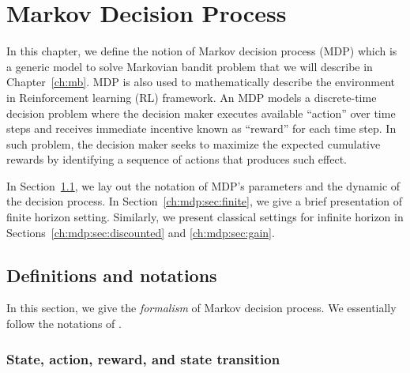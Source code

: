 \begingroup

\let\clearpage\relax

\chapter{Markov Decision Process}
\label{ch:mdp}


In this chapter, we define the notion of Markov decision process (MDP) which is a generic model to solve Markovian bandit problem that we will describe in Chapter~\ref{ch:mb}.
MDP is also used to mathematically describe the environment in Reinforcement learning (RL) framework.
An MDP models a discrete-time decision problem where the decision maker executes available ``action'' over time steps and receives immediate incentive known as ``reward'' for each time step.
In such problem, the decision maker seeks to maximize the expected cumulative rewards by identifying a sequence of actions that produces such effect.

In Section~\ref{ch:mdp:sec:defn}, we lay out the notation of MDP's parameters and the dynamic of the decision process.
In Section~\ref{ch:mdp:sec:finite}, we give a brief presentation of finite horizon setting.
Similarly, we present classical settings for infinite horizon in Sections~\ref{ch:mdp:sec:discounted} and \ref{ch:mdp:sec:gain}.


\section{Definitions and notations}
\label{ch:mdp:sec:defn}

In this section, we give the \emph{formalism} of Markov decision process. %
We essentially follow the notations of \cite{puterman2014markov}.

\subsection{State, action, reward, and state transition}

